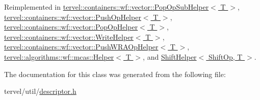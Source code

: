 Reimplemented in \hyperlink{classtervel_1_1containers_1_1wf_1_1vector_1_1_pop_op_sub_helper_ae0fcfb9527874f0b321b0fd48a295833}{tervel\+::containers\+::wf\+::vector\+::\+Pop\+Op\+Sub\+Helper$<$ T $>$}, \hyperlink{classtervel_1_1containers_1_1wf_1_1vector_1_1_push_op_helper_a26ce47d7b64eedcf1983508f5a60d5b7}{tervel\+::containers\+::wf\+::vector\+::\+Push\+Op\+Helper$<$ T $>$}, \hyperlink{classtervel_1_1containers_1_1wf_1_1vector_1_1_pop_op_helper_a2b421b2a3cb984bd94abe3ee254ac819}{tervel\+::containers\+::wf\+::vector\+::\+Pop\+Op\+Helper$<$ T $>$}, \hyperlink{classtervel_1_1containers_1_1wf_1_1vector_1_1_write_helper_a4c914b2218dfcfffaae66e85ff77e6df}{tervel\+::containers\+::wf\+::vector\+::\+Write\+Helper$<$ T $>$}, \hyperlink{classtervel_1_1containers_1_1wf_1_1vector_1_1_push_w_r_a_op_helper_ab330b531d19d3ef8c8b86e239ce22215}{tervel\+::containers\+::wf\+::vector\+::\+Push\+W\+R\+A\+Op\+Helper$<$ T $>$}, \hyperlink{classtervel_1_1algorithms_1_1wf_1_1mcas_1_1_helper_a381449ae3b9624302008a581610f76b5}{tervel\+::algorithms\+::wf\+::mcas\+::\+Helper$<$ T $>$}, and \hyperlink{class_shift_helper_ad7f8e39f62c9646ec5862df3ee1e5ab4}{Shift\+Helper$<$ Shift\+Op, T $>$}.



The documentation for this class was generated from the following file\+:\begin{DoxyCompactItemize}
\item 
tervel/util/\hyperlink{descriptor_8h}{descriptor.\+h}\end{DoxyCompactItemize}
